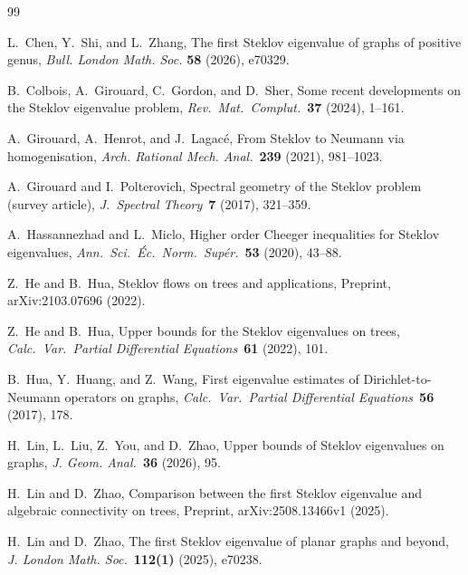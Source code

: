 \documentclass[11pt]{article}
\theoremstyle{definition}
\theoremstyle{remark}
\begin{document}
\begin{thebibliography}{99}


L.~Chen, Y.~Shi, and L.~Zhang,
The first Steklov eigenvalue of graphs of positive genus, \emph{Bull. London Math. Soc.} \textbf{58} (2026), e70329.


B.~Colbois, A.~Girouard, C.~Gordon, and D.~Sher,
Some recent developments on the Steklov eigenvalue problem,
\emph{Rev.\ Mat.\ Complut.}\ \textbf{37} (2024), 1--161.


A.~Girouard, A.~Henrot, and J.~Lagac\'e,
From Steklov to Neumann via homogenisation,
\emph{Arch. Rational Mech. Anal.}\ \textbf{239} (2021), 981--1023.

A.~Girouard and I.~Polterovich,
Spectral geometry of the Steklov problem (survey article),
\emph{J.\ Spectral Theory}\ \textbf{7} (2017), 321--359.

A.~Hassannezhad and L.~Miclo,
Higher order Cheeger inequalities for Steklov eigenvalues,
\emph{Ann.\ Sci.\ \'Ec.\ Norm.\ Sup\'er.}\ \textbf{53} (2020), 43--88.


Z.~He and B.~Hua,
Steklov flows on trees and applications,
Preprint, arXiv:2103.07696  (2022).

Z.~He and B.~Hua,
Upper bounds for the Steklov eigenvalues on trees,
\emph{Calc.\ Var.\ Partial Differential Equations}\ \textbf{61} (2022), 101.

B.~Hua, Y.~Huang, and Z.~Wang,
First eigenvalue estimates of Dirichlet-to-Neumann operators on graphs,
\emph{Calc.\ Var.\ Partial Differential Equations}\ \textbf{56} (2017), 178.

H.~Lin, L.~Liu, Z.~You, and D.~Zhao,
Upper bounds of Steklov eigenvalues on graphs,
\emph{J. Geom. Anal.}\ \textbf{36} (2026), 95.

H.~Lin and D.~Zhao,
Comparison between the first Steklov eigenvalue and algebraic connectivity on trees,
Preprint, arXiv:2508.13466v1  (2025).

H.~Lin and D.~Zhao,
The first Steklov eigenvalue of planar graphs and beyond, 
\emph{J. London Math. Soc.}\ \textbf{112(1)} (2025), e70238.


\end{thebibliography}
\end{document}
